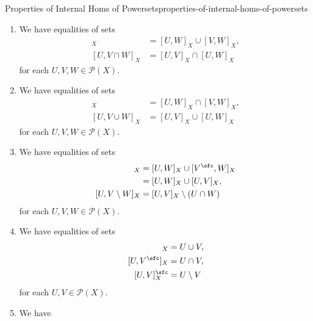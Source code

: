 \begin{proposition}{Properties of Internal Homs of Powersets}{properties-of-internal-homs-of-powersets}
\begin{enumerate}
\[            \]%
            for each $U\in\mathcal{P}(X)$ and each $\mathcal{V}\in\mathcal{P}(\mathcal{P}(X))$.
        \item\label{properties-of-internal-homs-of-powersets-interaction-with-binary-unions}We have equalities of sets
            \begin{align*}
                [U\cap V,W]_{X} &= [U,W]_{X}\cup[V,W]_{X},\\
                [U,V\cap W]_{X} &= [U,V]_{X}\cap[U,W]_{X}
            \end{align*}
            for each $U,V,W\in\mathcal{P}(X)$.
        \item\label{properties-of-internal-homs-of-powersets-interaction-with-binary-intersections}We have equalities of sets
            \begin{align*}
                [U\cup V,W]_{X} &= [U,W]_{X}\cap[V,W]_{X},\\
                [U,V\cup W]_{X} &= [U,V]_{X}\cup[U,W]_{X}
            \end{align*}
            for each $U,V,W\in\mathcal{P}(X)$.
        \item\label{properties-of-internal-homs-of-powersets-interaction-with-differences}We have equalities of sets
            \begin{align*}
                [U\setminus V,W]_{X} &= [U,W]_{X}\cup[V^{\sfc},W]_{X}\\
                                     &= [U,W]_{X}\cup[U,V]_{X},\\
                [U,V\setminus W]_{X} &= [U,V]_{X}\setminus(U\cap W)%
            \end{align*}
            for each $U,V,W\in\mathcal{P}(X)$.
        \item\label{properties-of-internal-homs-of-powersets-interaction-with-complements}We have equalities of sets
            \begin{align*}
                [U^{\sfc},V]_{X} &= U\cup V,\\
                [U,V^{\sfc}]_{X} &= U\cap V,\\
                [U,V]^{\sfc}_{X} &= U\setminus V
            \end{align*}
            for each $U,V\in\mathcal{P}(X)$.
        \item\label{properties-of-internal-homs-of-powersets-interaction-with-characteristic-functions}We have

\end{enumerate}
\end{proposition}
